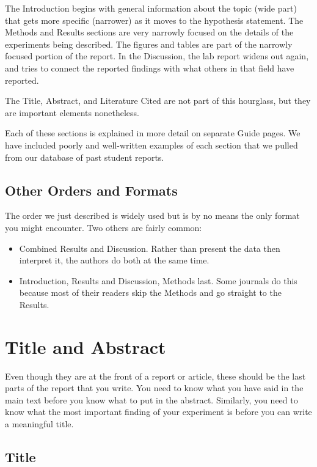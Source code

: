 \documentclass[
]{book}
\providecommand{\tightlist}{%
  \setlength{\itemsep}{0pt}\setlength{\parskip}{0pt}}
\begin{document}
The Introduction begins with general information about the topic (wide part) that gets more specific (narrower) as it moves to the hypothesis statement. The Methods and Results sections are very narrowly focused on the details of the experiments being described. The figures and tables are part of the narrowly focused portion of the report. In the Discussion, the lab report widens out again, and tries to connect the reported findings with what others in that field have reported.

The Title, Abstract, and Literature Cited are not part of this hourglass, but they are important elements nonetheless.

Each of these sections is explained in more detail on separate Guide pages. We have included poorly and well-written examples of each section that we pulled from our database of past student reports.

\hypertarget{other-orders-and-formats}{%
\section{Other Orders and Formats}\label{other-orders-and-formats}}

The order we just described is widely used but is by no means the only format you might encounter. Two others are fairly common:

\begin{itemize}
\tightlist
\item
  Combined Results and Discussion. Rather than present the data then interpret it, the authors do both at the same time.
\item
  Introduction, Results and Discussion, Methods last. Some journals do this because most of their readers skip the Methods and go straight to the Results.
\end{itemize}

\hypertarget{titles320}{%
\chapter{Title and Abstract}\label{titles320}}

Even though they are at the front of a report or article, these should be the last parts of the report that you write. You need to know what you have said in the main text before you know what to put in the abstract. Similarly, you need to know what the most important finding of your experiment is before you can write a meaningful title.

\hypertarget{title}{%
\section{Title}\label{title}}
\end{document}
